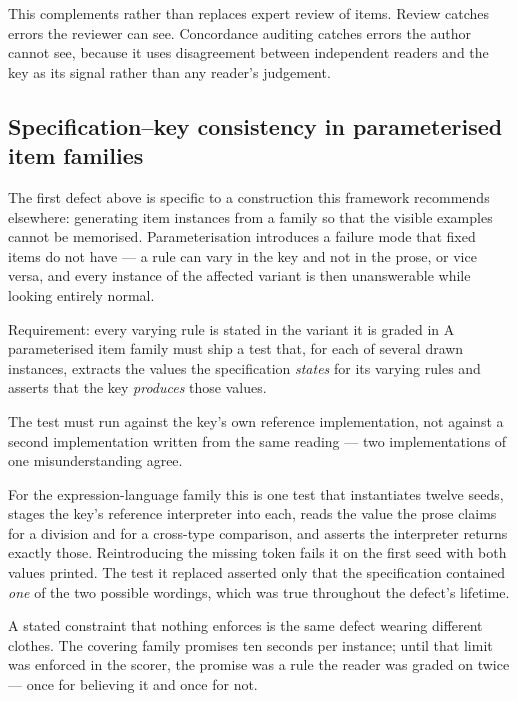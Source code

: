 This complements rather than replaces expert review of items. Review catches errors the reviewer can see. Concordance auditing catches errors the author cannot see, because it uses disagreement between independent readers and the key as its signal rather than any reader's judgement.

\subsection{Specification--key consistency in parameterised item families}\label{sec:speckey}

The first defect above is specific to a construction this framework recommends elsewhere: generating item instances from a family so that the visible examples cannot be memorised. Parameterisation introduces a failure mode that fixed items do not have --- a rule can vary in the key and not in the prose, or vice versa, and every instance of the affected variant is then unanswerable while looking entirely normal.

\begin{claimbox}{Requirement: every varying rule is stated in the variant it is graded in}
A parameterised item family must ship a test that, for each of several drawn instances, extracts the values the specification \emph{states} for its varying rules and asserts that the key \emph{produces} those values.

The test must run against the key's own reference implementation, not against a second implementation written from the same reading --- two implementations of one misunderstanding agree.
\end{claimbox}

For the expression-language family this is one test that instantiates twelve seeds, stages the key's reference interpreter into each, reads the value the prose claims for a division and for a cross-type comparison, and asserts the interpreter returns exactly those. Reintroducing the missing token fails it on the first seed with both values printed. The test it replaced asserted only that the specification contained \emph{one} of the two possible wordings, which was true throughout the defect's lifetime.

A stated constraint that nothing enforces is the same defect wearing different clothes. The covering family promises ten seconds per instance; until that limit was enforced in the scorer, the promise was a rule the reader was graded on twice --- once for believing it and once for not.

